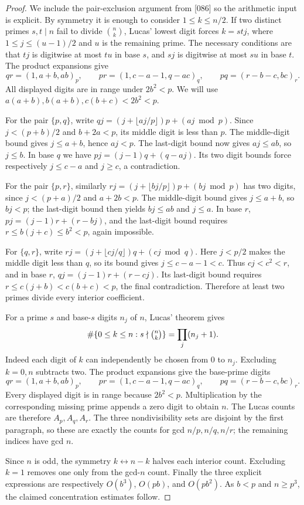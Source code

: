 \documentclass[11pt,a4paper]{article}
\theoremstyle{definition}
\theoremstyle{remark}
\numberwithin{equation}{section}
\begin{document}
\begin{proof}
We include the pair-exclusion argument from [086] so the arithmetic
input is explicit.  By symmetry it is enough to consider
$1\le k\le n/2$.  If two distinct primes $s,t\mid n$ fail to divide
$\binom nk$, Lucas' lowest digit forces $k=stj$, where
$1\le j\le(u-1)/2$ and $u$ is the remaining prime.  The necessary
conditions are that $tj$ is digitwise at most $tu$ in base $s$, and
$sj$ is digitwise at most $su$ in base $t$.
The product expansions give
\[
 qr=(1,a+b,ab)_p,\qquad
 pr=(1,c-a-1,q-ac)_q,\qquad
 pq=(r-b-c,bc)_r.
\]
All displayed digits are in range under $2b^2<p$.
We will use $a(a+b),b(a+b),c(b+c)<2b^2<p$.

For the pair $\{p,q\}$, write
$qj=(j+\lfloor aj/p\rfloor)p+(aj\bmod p)$.
Since $j<(p+b)/2$ and $b+2a<p$, its middle digit is less than $p$.
The middle-digit bound gives $j\le a+b$, hence $aj<p$.
The last-digit bound now gives $aj\le ab$, so $j\le b$.
In base $q$ we have $pj=(j-1)q+(q-aj)$.
Its two digit bounds force respectively $j\le c-a$ and $j\ge c$,
a contradiction.

For the pair $\{p,r\}$, similarly
$rj=(j+\lfloor bj/p\rfloor)p+(bj\bmod p)$ has two digits,
since $j<(p+a)/2$ and $a+2b<p$.
The middle-digit bound gives $j\le a+b$, so $bj<p$;
the last-digit bound then yields $bj\le ab$ and $j\le a$.
In base $r$, $pj=(j-1)r+(r-bj)$, and the last-digit bound requires
$r\le b(j+c)\le b^2<p$, again impossible.

For $\{q,r\}$, write
$rj=(j+\lfloor cj/q\rfloor)q+(cj\bmod q)$.
Here $j<p/2$ makes the middle digit less than $q$, so its bound gives
$j\le c-a-1<c$.  Thus $cj<c^2<r$, and in base $r$,
$qj=(j-1)r+(r-cj)$.  Its last-digit bound requires
$r\le c(j+b)<c(b+c)<p$, the final contradiction.
Therefore at least two primes divide every interior coefficient.

For a prime $s$ and base-$s$ digits $n_j$ of $n$, Lucas' theorem gives
\[
 \#\{0\le k\le n:s\nmid\tbinom nk\}=\prod_j(n_j+1).
\]
Indeed each digit of $k$ can independently be chosen from $0$ to
$n_j$.  Excluding $k=0,n$ subtracts two.  The product expansions
give the base-prime digits
\[
 qr=(1,a+b,ab)_p,\qquad
 pr=(1,c-a-1,q-ac)_q,\qquad
 pq=(r-b-c,bc)_r.
\]
Every displayed digit is in range because $2b^2<p$.
Multiplication by the corresponding missing prime appends a zero
digit to obtain $n$.  The Lucas counts are therefore $A_p,A_q,A_r$.
The three nondivisibility sets are disjoint by the first paragraph,
so these are exactly the counts for gcd $n/p,n/q,n/r$; the remaining
indices have gcd $n$.

Since $n$ is odd, the symmetry $k\leftrightarrow n-k$ halves each
interior count.  Excluding $k=1$ removes one only from the gcd-$n$
count.  Finally the three explicit expressions are respectively
$O(b^3)$, $O(pb)$, and $O(pb^2)$.  As $b<p$ and $n\ge p^3$, the
claimed concentration estimates follow.
\end{proof}
\end{document}
